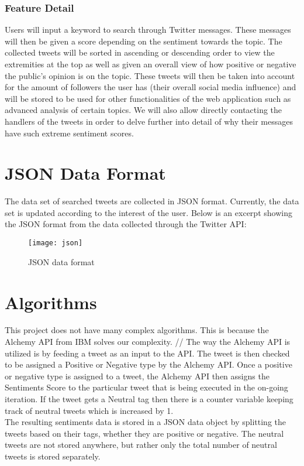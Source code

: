 \documentclass[12pt, titlepage]{article}
\begin{document}
\subsubsection{Feature Detail}
Users will input a keyword to search through Twitter messages. These messages will then be given a score depending on the sentiment towards the topic. The collected tweets will be sorted in ascending or descending order to view the extremities at the top as well as given an overall view of how positive or negative the public’s opinion is on the topic. These tweets will then be taken into account for the amount of followers the user has (their overall social media influence) and will be stored to be used for other functionalities of the web application such as advanced analysis of certain topics. We will also allow directly contacting the handlers of the tweets in order to delve further into detail of why their messages have such extreme sentiment scores.
\fi






\newpage
\section{JSON Data Format}
The data set of searched tweets are collected in JSON format. Currently, the data set is updated according to the interest of the user. 
Below is an excerpt showing the JSON format from the data collected through the Twitter API:
\begin{figure}[H]
\centering
\texttt{[image: json]}
\caption{JSON data format}
\label{fig:Result}
\end{figure}

\newpage
\section{Algorithms}
This project does not have many complex algorithms. This is because the Alchemy API from IBM solves our complexity. //
The way the Alchemy API is utilized is by feeding a tweet as an input to the API. The tweet is then checked to be assigned a Positive or Negative type by the Alchemy API. Once a positive or negative type is assigned to a tweet, the Alchemy API then assigns the Sentiments Score to the particular tweet that is being executed in the on-going iteration. If the tweet gets a Neutral tag then there is a counter variable keeping track of neutral tweets which is increased by 1. \\
The resulting sentiments data is stored in a JSON data object by splitting the tweets based on their tags, whether they are positive or negative. The neutral tweets are not stored anywhere, but rather only the total number of neutral tweets is stored separately. 
\end{document}
